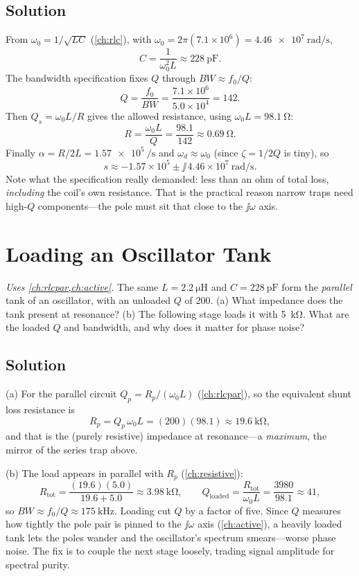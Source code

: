 \subsection*{Solution}
From \(\omega_0=1/\sqrt{LC}\) (\cref{ch:rlc}), with
\(\omega_0=2\pi(7.1\times10^6)=\SI{4.46e7}{\radian\per\second}\),
\[
C=\frac{1}{\omega_0^2L}\approx\SI{228}{\pico\farad}.
\]
The bandwidth specification fixes \(Q\) through \(BW\approx f_0/Q\):
\[
Q=\frac{f_0}{BW}=\frac{7.1\times10^6}{5.0\times10^4}=142 .
\]
Then \(Q_s=\omega_0L/R\) gives the allowed resistance, using
\(\omega_0L=\SI{98.1}{\ohm}\):
\[
R=\frac{\omega_0L}{Q}=\frac{98.1}{142}\approx\SI{0.69}{\ohm}.
\]
Finally \(\alpha=R/2L=\SI{1.57e5}{\per\second}\) and \(\omega_d\approx\omega_0\)
(since \(\zeta=1/2Q\) is tiny), so
\[
s\approx-1.57\times10^{5}\pm\jj\,4.46\times10^{7}\ \si{\radian\per\second}.
\]
Note what the specification really demanded: less than an ohm of total loss,
\emph{including} the coil's own resistance. That is the practical reason narrow traps
need high-\(Q\) components---the pole must sit that close to the \(\jj\omega\) axis.

\section{Loading an Oscillator Tank}
\emph{Uses \cref{ch:rlcpar,ch:active}.} The same \(L=\SI{2.2}{\micro\henry}\) and
\(C=\SI{228}{\pico\farad}\) form the \emph{parallel} tank of an oscillator, with an
unloaded \(Q\) of \(200\). (a) What impedance does the tank present at resonance?
(b) The following stage loads it with \SI{5}{\kilo\ohm}. What are the loaded \(Q\) and
bandwidth, and why does it matter for phase noise?

\subsection*{Solution}
(a) For the parallel circuit \(Q_p=R_p/(\omega_0L)\) (\cref{ch:rlcpar}), so the
equivalent shunt loss resistance is
\[
R_p=Q_p\,\omega_0L=(200)(98.1)\approx\SI{19.6}{\kilo\ohm},
\]
and that is the (purely resistive) impedance at resonance---a \emph{maximum}, the
mirror of the series trap above.

(b) The load appears in parallel with \(R_p\) (\cref{ch:resistive}):
\[
R_{\text{tot}}=\frac{(19.6)(5.0)}{19.6+5.0}\approx\SI{3.98}{\kilo\ohm},
\qquad
Q_{\text{loaded}}=\frac{R_{\text{tot}}}{\omega_0L}=\frac{3980}{98.1}\approx41,
\]
so \(BW\approx f_0/Q\approx\SI{175}{\kilo\hertz}\). Loading cut \(Q\) by a factor of
five. Since \(Q\) measures how tightly the pole pair is pinned to the \(\jj\omega\)
axis (\cref{ch:active}), a heavily loaded tank lets the poles wander and the
oscillator's spectrum smears---worse phase noise. The fix is to couple the next stage
loosely, trading signal amplitude for spectral purity.

